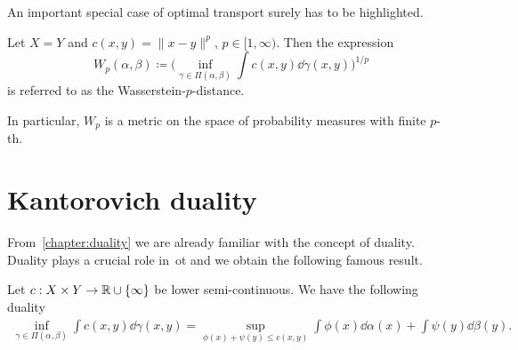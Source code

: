 An important special case of optimal transport surely has to be highlighted.

\begin{defn}
Let $X=Y$ and $c(x,y) = \|x-y\|^p$, $p\in[1,\infty)$. Then the expression
\begin{equation}
    W_p(\alpha,\beta) \coloneqq \bigg(\inf_{\gamma\in\Pi(\alpha,\beta)}\int c(x,y)\dd \gamma(x,y)\bigg)^{1/p}
\end{equation}
is referred to as the Wasserstein-$p$-distance.
\end{defn}
In particular, $W_p$ is a metric on the space of probability measures with finite $p$-th.

\section{Kantorovich duality}
From~\cref{chapter:duality} we are already familiar with the concept of duality. Duality plays a crucial role in~\gls{ot} and we obtain the following famous result.
\begin{theorem}
    Let $c:X\times Y\rightarrow \mathbb{R}\cup\{\infty\}$ be lower semi-continuous. We have the following duality
    \begin{equation}
        \begin{aligned}
            \inf_{\gamma\in\Pi(\alpha,\beta)}\int c(x,y) \dd \gamma(x,y) 
            = \sup_{\phi(x)+\psi(y)\leq c(x,y)}\int \phi(x)\dd\alpha(x) + \int \psi(y)\dd \beta(y).
        \end{aligned}
    \end{equation}
\end{theorem}
